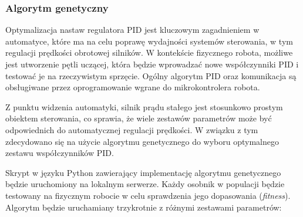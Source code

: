\documentclass[12pt,twoside]{article}
\begin{document}
\subsubsection{Algorytm genetyczny}

Optymalizacja nastaw regulatora PID jest kluczowym zagadnieniem w automatyce, które ma na celu poprawę wydajności systemów sterowania, w tym regulacji prędkości obrotowej silników. W kontekście fizycznego robota, możliwe jest utworzenie pętli uczącej, która będzie wprowadzać nowe współczynniki PID i testować je na rzeczywistym sprzęcie. Ogólny algorytm PID oraz komunikacja są obsługiwane przez oprogramowanie wgrane do mikrokontrolera robota. 

Z punktu widzenia automatyki, silnik prądu stałego jest stosunkowo prostym obiektem sterowania, co sprawia, że wiele zestawów parametrów może być odpowiednich do automatycznej regulacji prędkości. W związku z tym zdecydowano się na użycie algorytmu genetycznego do wyboru optymalnego zestawu współczynników PID.

Skrypt w języku Python zawierający implementację algorytmu genetycznego będzie uruchomiony na lokalnym serwerze. Każdy osobnik w populacji będzie testowany na fizycznym robocie w celu sprawdzenia jego dopasowania (\textit{fitness}). Algorytm będzie uruchamiany trzykrotnie z różnymi zestawami parametrów:
\end{document}
